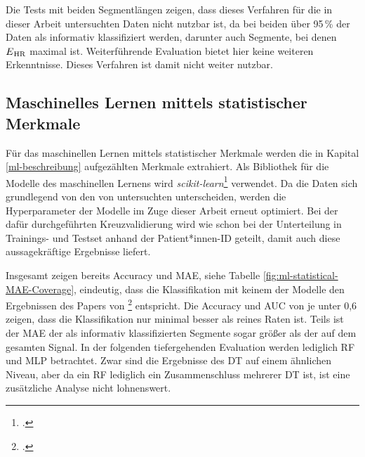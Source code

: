 Die Tests mit beiden Segmentlängen zeigen, dass dieses Verfahren für die in dieser Arbeit untersuchten Daten nicht nutzbar ist, da bei beiden über 95\,\% der Daten als informativ klassifiziert werden, darunter auch Segmente, bei denen $E\textsubscript{HR}$ maximal ist. Weiterführende Evaluation bietet hier keine weiteren Erkenntnisse. Dieses Verfahren ist damit nicht weiter nutzbar.

\subsection{Maschinelles Lernen mittels statistischer Merkmale}\label{res-statistical}

Für das maschinellen Lernen mittels statistischer Merkmale werden die in Kapital \ref{ml-beschreibung} aufgezählten Merkmale extrahiert. Als Bibliothek für die Modelle des maschinellen Lernens wird \textit{scikit-learn}\footcite[]{scikit-learn} verwendet. Da die Daten sich grundlegend von den von \citeauthor{Sadek2016} untersuchten unterscheiden, werden die Hyperparameter der Modelle im Zuge dieser Arbeit erneut optimiert. Bei der dafür durchgeführten Kreuzvalidierung wird wie schon bei der Unterteilung in Trainings- und Testset anhand der Patient*innen-ID geteilt, damit auch diese aussagekräftige Ergebnisse liefert.

Insgesamt zeigen bereits Accuracy und \ac{MAE}, siehe Tabelle \ref{fig:ml-statistical-MAE-Coverage}, eindeutig, dass die Klassifikation mit keinem der Modelle den Ergebnissen des Papers von \citeauthor{Sadek2016}\footcite{Sadek2016} entspricht. Die Accuracy und AUC von je unter 0,6 zeigen, dass die Klassifikation nur minimal besser als reines Raten ist. Teils ist der \ac{MAE} der als informativ klassifizierten Segmente sogar größer als der auf dem gesamten Signal. In der folgenden tiefergehenden Evaluation werden lediglich \ac{RF} und \ac{MLP} betrachtet. Zwar sind die Ergebnisse des \ac{DT} auf einem ähnlichen Niveau, aber da ein \ac{RF} lediglich ein Zusammenschluss mehrerer \ac{DT} ist, ist eine zusätzliche Analyse nicht lohnenswert. 

